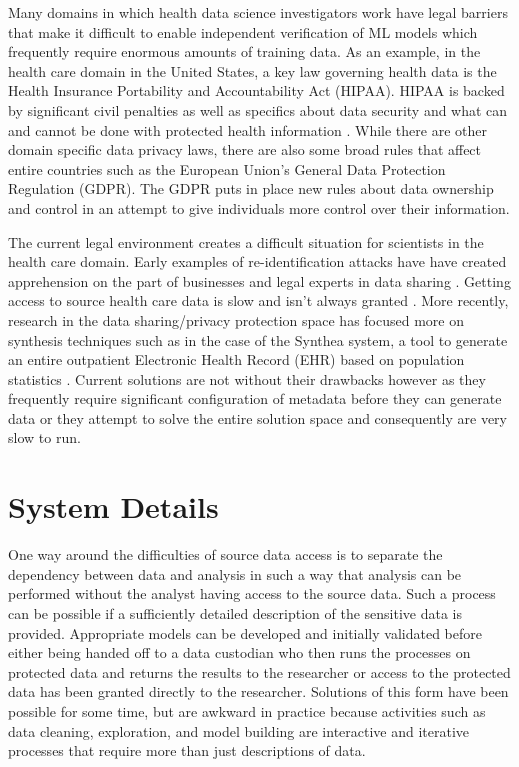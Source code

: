 \documentclass{amia}
\begin{document}
Many domains in which health data science investigators work have legal barriers that make it difficult to enable independent verification of ML models which frequently require enormous amounts of training data. As an example, in the health care domain in the United States, a key law governing health data is the Health Insurance Portability and Accountability Act (HIPAA). HIPAA is backed by significant civil penalties as well as specifics about data security and what can and cannot be done with protected health information \cite{hippaviol}. While there are other domain specific data privacy laws, there are also some broad rules that affect entire countries such as the European Union's General Data Protection Regulation (GDPR). The GDPR puts in place new rules about data ownership and control in an attempt to give individuals more control over their information.

The current legal environment creates a difficult situation for scientists in the health care domain. Early examples of re-identification attacks \cite{sweeney_2002} have have created apprehension on the part of businesses and legal experts in data sharing \cite{ohm_broken_2009}. Getting access to source health care data is slow and isn't always granted \cite{hodge_legal_1999, committee_hipaa_privacy_rule_2009}. More recently, research in the data sharing/privacy protection space has focused more on synthesis techniques such as in the case of the Synthea system, a tool to generate an entire outpatient Electronic Health Record (EHR) based on population statistics \cite{walonoski_synthea_2018}. Current solutions are not without their drawbacks however as they frequently require significant configuration of metadata before they can generate data or they attempt to solve the entire solution space and consequently are very slow to run.

\section{System Details}

One way around the difficulties of source data access is to separate the dependency between data and analysis in such a way that analysis can be performed without the analyst having access to the source data. Such a process can be possible if a sufficiently detailed description of the sensitive data is provided. Appropriate models can be developed and initially validated before either being handed off to a data custodian who then runs the processes on protected data and returns the results to the researcher or access to the protected data has been granted directly to the researcher. Solutions of this form have been possible for some time, but are awkward in practice because activities such as data cleaning, exploration, and model building are interactive and iterative processes that require more than just descriptions of data.
\end{document}
